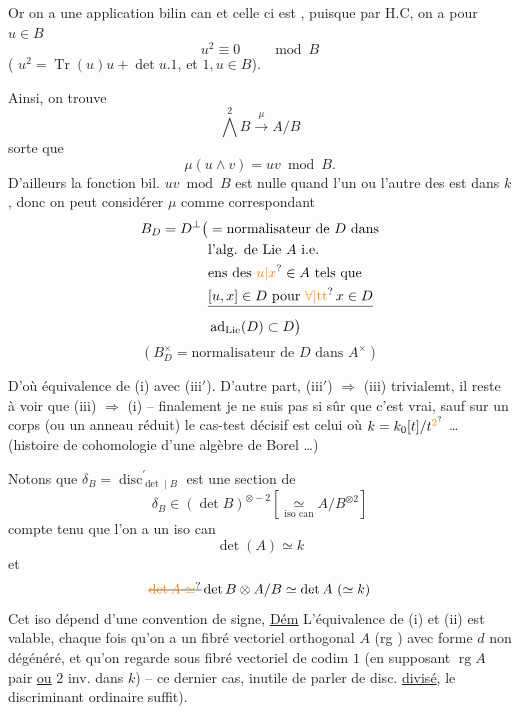 Or on a une application bilin can
et celle ci est , puisque par H.C, on a pour $u\in B$
\[
u^2\equiv0\qquad\bmod B
\]
( $u^2=\operatorname{Tr}(u)u+\det u.1$, et $1,u\in B$).

Ainsi, on trouve
\[
\bigwedge^2 B\xrightarrow{\mu} A/B
\]
 sorte que
\[
\mu(u\wedge v)=uv\bmod B.
\]
D'ailleurs \deleted{\unsure{$\mu$}} la fonction bil. $uv\bmod B$ est nulle quand l'un ou l'autre des  est dans $k$, donc on peut considérer $\mu$ comme
correspondant
\[
\begin{aligned}
B_D=D^\perp\bigl(&=\text{normalisateur de }D\text{ dans}\\
&\text{l'alg. de Lie }A\text{ i.e.}\\
&\text{ens des }\unsure{u|x}\in A\text{ tels que}\\
&\deleted{[u,x]\in D\ \text{pour }\unsure{\forall|\text{tt}}\,x\in D}\\
&\operatorname{ad}_{\text{Lie}}(D)\subset D\bigr)
\end{aligned}
\]
\[
(B_D^\times=\text{normalisateur de }D\text{ dans }A^\times)
\]

D'où équivalence de (i) avec (iii$'$). D'autre part, (iii$'$) $\Rightarrow$ (iii) trivialemt, il reste à voir que (iii) $\Rightarrow$ (i) -- finalement je ne suis pas si sûr que c'est vrai, sauf sur un corps (ou un anneau réduit) le cas-test décisif est celui où $k=k_0[t]/t^{\unsure{2}}$ \ldots{} (histoire de cohomologie d'une algèbre de Borel \ldots)

 Notons que $\delta_B=\operatorname{disc}^{\prime}_{\det\mid B}$ est une section de
\[
\delta_B\in(\det B)^{\otimes-2}\left[\underset{\text{iso can}}{\simeq} A/B^{\otimes2}\right]
\]
compte tenu que l'on a un iso can
\[
\det(A)\simeq k
\]
et
\[
\deleted{\unsure{\det A\simeq}}\det B\otimes A/B\simeq\det A\ (\simeq k)
\]
Cet iso dépend d'une convention de signe,
\uline{Dém} L'équivalence de (i) et (ii) est valable, chaque fois qu'on a un fibré vectoriel orthogonal $A$ (rg ) avec forme $d$ non dégénéré, et qu'on regarde    sous fibré vectoriel de codim $1$ (en supposant $\operatorname{rg}A$ pair \uline{ou} $2$ inv. dans $k$) --   ce dernier cas, inutile de parler de disc. \uline{divisé}, le discriminant ordinaire suffit).

